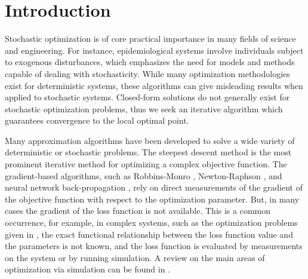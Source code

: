 \section{Introduction}\label{intro}

Stochastic optimization is of core practical importance in many fields of science and engineering. For instance, epidemiological systems involve individuals subject to exogenous disturbances, which emphasizes the need for models and methods capable of dealing with stochasticity. While many optimization methodologies exist for deterministic systems, these algorithms can give misleading results when applied to stochastic systems. Closed-form solutions do not generally exist for stochastic optimization problems, thus we seek an iterative algorithm which guarantees convergence to the local optimal point. 

Many approximation algorithms have been developed to solve a wide variety of deterministic or stochastic problems. The steepest descent method \cite{Nocedal99} is the most prominent iterative method for optimizing a complex objective function. The gradient-based algorithms, such as Robbins-Monro \cite{robbins1951stochastic}, Newton-Raphson \cite{froberg1969introduction}, and neural network back-propagation \cite{rumelhart1985learning}, rely on direct measurements of the gradient of the objective function with respect to the optimization parameter. But, in many cases the gradient of the loss function is not available. This is a common occurrence, for example, in complex systems, such as the optimization problems given in \cite{tsilifis2017efficient,alaeddini2017application}, the exact functional relationship between the loss function value and the parameters is not known, and the loss function is evaluated by measurements on the system or by running simulation. A review on the main areas of optimization via simulation can be found in \cite{fu1994optimization,hong2009brief,swisher2000survey}.

